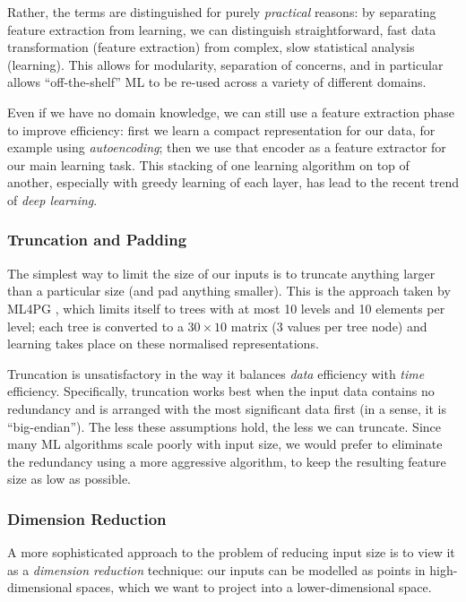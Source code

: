 Rather, the terms are distinguished for purely \emph{practical} reasons: by
separating feature extraction from learning, we can distinguish straightforward,
fast data transformation (feature extraction) from complex, slow statistical
analysis (learning). This allows for modularity, separation of concerns, and in
particular allows ``off-the-shelf'' ML to be re-used across a variety of
different domains.

Even if we have no domain knowledge, we can still use a feature extraction phase
to improve efficiency: first we learn a compact representation for our data, for
example using \emph{autoencoding}; then we use that encoder as a feature
extractor for our main learning task. This stacking of one learning algorithm on
top of another, especially with greedy learning of each layer, has lead to the
recent trend of \emph{deep learning}.

\subsubsection{Truncation and Padding}

The simplest way to limit the size of our inputs is to truncate anything larger
than a particular size (and pad anything smaller). This is the approach taken by
ML4PG \cite{journals/corr/abs-1302-6421}, which limits itself to trees with at
most 10 levels and 10 elements per level; each tree is converted to a
$30 \times 10$ matrix (3 values per tree node) and learning takes place on these
normalised representations.

Truncation is unsatisfactory in the way it balances \emph{data} efficiency with
\emph{time} efficiency. Specifically, truncation works best when the input data
contains no redundancy and is arranged with the most significant data first (in
a sense, it is ``big-endian''). The less these assumptions hold, the less we can
truncate. Since many ML algorithms scale poorly with input size, we would prefer
to eliminate the redundancy using a more aggressive algorithm, to keep the
resulting feature size as low as possible.

\subsubsection{Dimension Reduction}

A more sophisticated approach to the problem of reducing input size is to view
it as a \emph{dimension reduction} technique: our inputs can be modelled as
points in high-dimensional spaces, which we want to project into a
lower-dimensional space.

